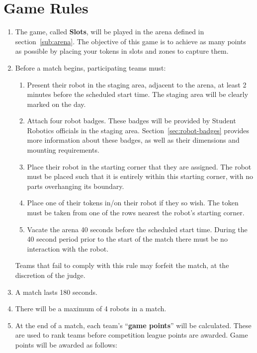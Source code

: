 \section {Game Rules}
\label{game-rules}

\begin{enumerate}
\item The game, called \textbf{Slots}, will be played in the arena defined in section~\ref{sub:arena}.
      The objective of this game is to achieve as many points as possible by placing your tokens in slots and zones to capture them.

\item Before a match begins, participating teams must:
\begin {enumerate}
  \item Present their robot in the staging area, adjacent to the arena, at least 2 minutes before the scheduled start time.
        The staging area will be clearly marked on the day.

  \item Attach four robot badges.
        These badges will be provided by Student Robotics officials in the staging area.
        Section~\ref{sec:robot-badges} provides more information about these badges, as well as their dimensions and mounting requirements.

  \item Place their robot in the starting corner that they are assigned.
        The robot must be placed such that it is entirely within this starting corner, with no parts overhanging its boundary.

  \item Place one of their tokens in/on their robot if they so wish.
        The token must be taken from one of the rows nearest the robot's starting corner.

  \item Vacate the arena 40 seconds before the scheduled start time.
        During the 40 second period prior to the start of the match there must be no interaction with the robot.
\end{enumerate}
  Teams that fail to comply with this rule may forfeit the match, at the discretion of the judge.

\item A match lasts 180 seconds.

\item There will be a maximum of 4 robots in a match.

\item At the end of a match, each team's ``\textbf{game points}'' will be calculated.
      These are used to rank teams before competition league points are awarded.
      Game points will be awarded as follows:


\end{enumerate}
